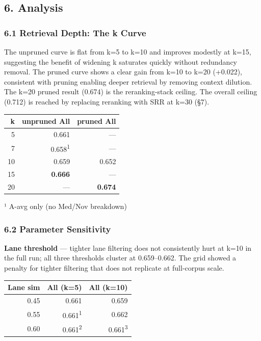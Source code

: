 \documentclass[
]{article}
\begin{document}
\subsection{6. Analysis}\label{analysis}

\subsubsection{6.1 Retrieval Depth: The k
Curve}\label{retrieval-depth-the-k-curve}

The unpruned curve is flat from k=5 to k=10 and improves modestly at
k=15, suggesting the benefit of widening k saturates quickly without
redundancy removal. The pruned curve shows a clear gain from k=10 to
k=20 (+0.022), consistent with pruning enabling deeper retrieval by
removing context dilution. The k=20 pruned result (0.674) is the
reranking-stack ceiling. The overall ceiling (0.712) is reached by
replacing reranking with SRR at k=30 (§7).

\begin{small}
\setlength{\tabcolsep}{4pt}
\begin{longtable}{rrr}
\toprule
\textbf{k} & \textbf{unpruned All} & \textbf{pruned All} \\
\midrule
\endhead
5 & 0.661 & — \\
7 & 0.658\textsuperscript{1} & — \\
10 & 0.659 & 0.652 \\
15 & \textbf{0.666} & — \\
20 & — & \textbf{0.674} \\
\bottomrule
\end{longtable}
\end{small}

¹ A-avg only (no Med/Nov breakdown)

\subsubsection{6.2 Parameter Sensitivity}\label{parameter-sensitivity}

\textbf{Lane threshold} --- tighter lane filtering does not consistently
hurt at k=10 in the full run; all three thresholds cluster at
0.659--0.662. The grid showed a penalty for tighter filtering that does
not replicate at full-corpus scale.

\begin{small}
\setlength{\tabcolsep}{4pt}
\begin{longtable}{rrr}
\toprule
\textbf{Lane sim} & \textbf{All (k=5)} & \textbf{All (k=10)} \\
\midrule
\endhead
0.45 & 0.661 & 0.659 \\
0.55 & 0.661\textsuperscript{1} & 0.662 \\
0.60 & 0.661\textsuperscript{2} & 0.661\textsuperscript{3} \\
\bottomrule
\end{longtable}
\end{small}
\end{document}
